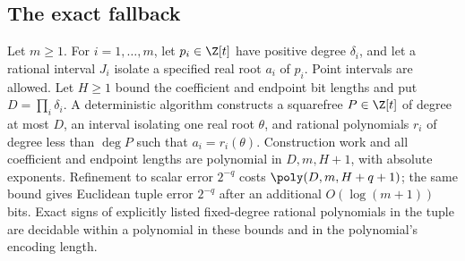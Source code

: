 \subsection{The exact fallback}\label{app:count:fallback}

\begin{lemma}\label{lem:count:shared-root}
Let $m\ge1$. For $i=1,\dots,m$, let $p_i\in\Z[t]$ have positive degree $\delta_i$, and
let a rational interval $J_i$ isolate a specified real root $a_i$ of $p_i$.
Point intervals are allowed. Let $H\ge1$ bound the coefficient and endpoint
bit lengths and put $D=\prod_i\delta_i$. A deterministic algorithm constructs
a squarefree $P\in\Z[t]$ of degree at most $D$, an interval isolating one
real root $\theta$, and rational polynomials $r_i$ of degree less than
$\deg P$ such that $a_i=r_i(\theta)$. Construction work and all coefficient
and endpoint lengths are polynomial in $D,m,H+1$, with absolute exponents.
Refinement to scalar error $2^{-q}$ costs $\poly(D,m,H+q+1)$; the same
bound gives Euclidean tuple error $2^{-q}$ after an additional
$O(\log(m+1))$ bits. Exact signs of explicitly listed fixed-degree rational
polynomials in the tuple are decidable within a polynomial in these bounds
and in the polynomial's encoding length.
\end{lemma}

